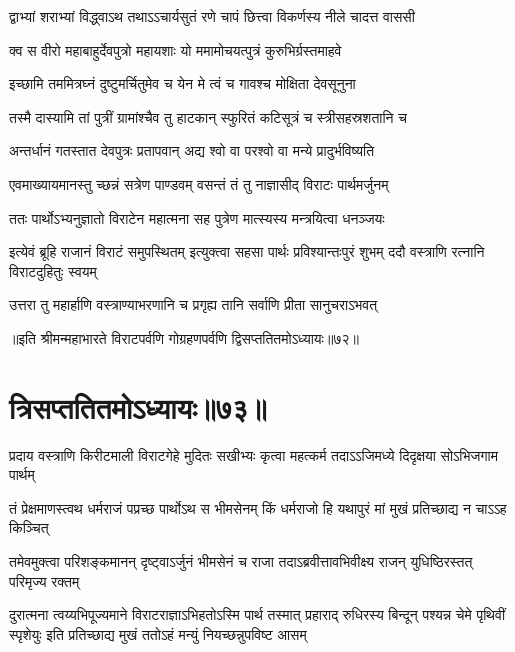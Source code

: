 \twolineshloka
{द्वाभ्यां शराभ्यां विद्ध्वाऽथ तथाऽऽचार्यसुतं रणे}
{चापं छित्त्वा विकर्णस्य नीले चादत्त वाससी}




\twolineshloka
{क्व स वीरो महाबाहुर्देवपुत्रो महायशाः}
{यो ममामोचयत्पुत्रं कुरुभिर्ग्रस्तमाहवे}


\twolineshloka
{इच्छामि तममित्रघ्नं दुष्टुमर्चितुमेव च}
{येन मे त्वं च गावश्च मोक्षिता देवसूनुना}


\twolineshloka
{तस्मै दास्यामि तां पुत्रीं ग्रामांश्चैव तु हाटकान्}
{स्फुरितं कटिसूत्रं च स्त्रीसहस्रशतानि च}




\twolineshloka
{अन्तर्धानं गतस्तात देवपुत्रः प्रतापवान्}
{अद्य श्वो वा परश्वो वा मन्ये प्रादुर्भविष्यति}



\twolineshloka
{एवमाख्यायमानस्तु च्छन्नं सत्रेण पाण्डवम्}
{वसन्तं तं तु नाज्ञासीद् विराटः पार्थमर्जुनम्}


\twolineshloka
{ततः पार्थोऽभ्यनुज्ञातो विराटेन महात्मना}
{सह पुत्रेण मात्स्यस्य मन्त्रयित्वा धनञ्जयः}


\threelineshloka
{इत्येवं ब्रूहि राजानं विराटं समुपस्थितम्}
{इत्युक्त्वा सहसा पार्थः प्रविश्यान्तःपुरं शुभम्}
{ददौ वस्त्राणि रत्नानि विराटदुहितुः स्वयम्}


\twolineshloka
{उत्तरा तु महार्हाणि वस्त्राण्याभरणानि च}
{प्रगृह्य तानि सर्वाणि प्रीता सानुचराऽभवत्}

॥इति श्रीमन्महाभारते विराटपर्वणि गोग्रहणपर्वणि द्विसप्ततितमोऽध्यायः॥७२॥

\chapter{त्रिसप्ततितमोऽध्यायः॥७३॥}

\fourlineindentedshloka
{प्रदाय वस्त्राणि किरीटमाली}
{विराटगेहे मुदितः सखीभ्यः}
{कृत्वा महत्कर्म तदाऽऽजिमध्ये}
{दिदृक्षया सोऽभिजगाम पार्थम्}


\fourlineindentedshloka
{तं प्रेक्षमाणस्त्वथ धर्मराजं}
{पप्रच्छ पार्थोऽथ स भीमसेनम्}
{किं धर्मराजो हि यथापुरं मां}
{मुखं प्रतिच्छाद्य न चाऽऽह किञ्चित्}


\fourlineindentedshloka
{तमेवमुक्त्वा परिशङ्कमानन्}
{दृष्ट्वाऽर्जुनं भीमसेनं च राजा}
{तदाऽब्रवीत्तावभिवीक्ष्य राजन्}
{युधिष्ठिरस्तत् परिमृज्य रक्तम्}


\sixlineindentedshloka
{दुरात्मना त्वय्यभिपूज्यमाने}
{विराटराज्ञाऽभिहतोऽस्मि पार्थ}
{तस्मात् प्रहाराद् रुधिरस्य बिन्दून्}
{पश्यन्न चेमे पृथिवीं स्पृशेयुः}
{इति प्रतिच्छाद्य मुखं ततोऽहं}
{मन्युं नियच्छन्नुपविष्ट आसम्}



